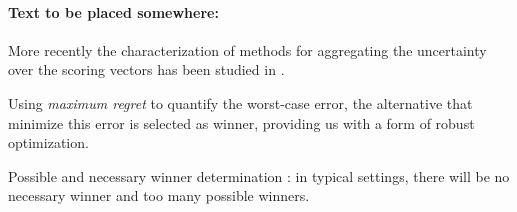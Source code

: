 \documentclass[12pt]{article}
\newcommand{\ppref}{\succ^\text{p}}%
\begin{document}
\paragraph{Text to be placed somewhere:}
More recently the characterization of methods for aggregating the uncertainty over the scoring vectors has been studied in \cite{Viappiani2018}.

\medskip
Using {\em maximum regret} to quantify the worst-case error, the alternative that minimize this error is selected as winner, providing us with a form of robust optimization.

\medskip
Possible and necessary winner determination \cite{Xia2008}: in typical settings, there will be no necessary winner and too many possible winners.



\end{document}
